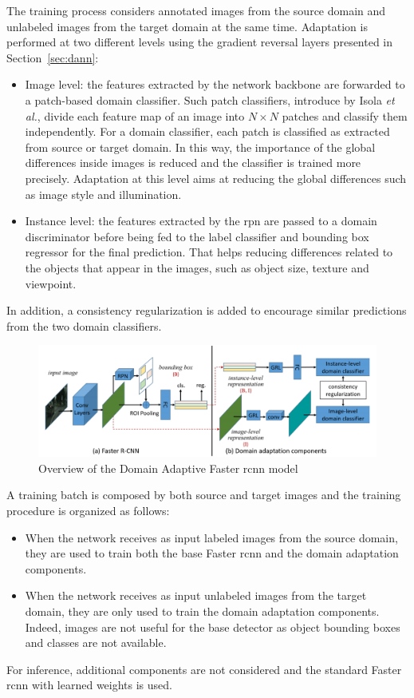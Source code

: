 \documentclass[%
    corpo=12pt,
    twoside,
    stile=classica,   
    tipotesi=magistrale,
    evenboxes,
    english,
	numerazioneromana,
]{toptesi}
\begin{document}
The training process considers annotated images from the source domain and unlabeled images from the target domain at the same time. Adaptation is performed at two different levels  using the gradient reversal layers presented in Section~\ref{sec:dann}:

\begin{itemize}
	\item Image level: the features extracted by the network backbone are forwarded to a patch-based domain classifier. Such patch classifiers, introduce by Isola \textit{et al.}\cite{isola2018imagetoimage}, divide each feature map of an image into $ N\times N $ patches and classify them independently. For a domain classifier, each patch is classified as extracted from source or target domain. In this way, the importance of the global differences inside images is reduced and the classifier is trained more precisely. Adaptation at this level aims at reducing the global differences such as image style and illumination.
	\item Instance level: the features extracted by the \gls{rpn} are passed to a domain discriminator before being fed to the label classifier and bounding box regressor for the final prediction. That helps reducing differences related to the objects that appear in the images, such as object size, texture and viewpoint.
\end{itemize}
In addition, a consistency regularization is added to encourage similar predictions from the two domain classifiers.

\begin{figure}[ht!]
	\centering
	\includegraphics[width=0.9\linewidth]{imgs/dafasterrcnn.png}
	\caption{Overview of the Domain Adaptive Faster \gls{rcnn} model\cite{chen2018domain}}
	\label{fig:dafasterrcnn}
\end{figure}

A training batch is composed by both source and target images and the training procedure is organized as follows:
\begin{itemize}
	\item When the network receives as input labeled images from the source domain, they are used to train both the base Faster \gls{rcnn} and the domain adaptation components.
	\item When the network receives as input unlabeled images from the target domain, they are only used to train the domain adaptation components. Indeed, images are not useful for the base detector as object bounding boxes and classes are not available.
\end{itemize}
For inference, additional components are not considered and the standard Faster \gls{rcnn} with learned weights is used.
\end{document}
